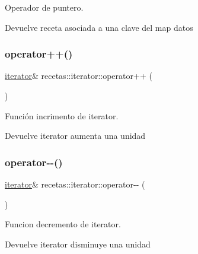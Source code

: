 Operador de puntero. 

\begin{DoxyReturn}{Devuelve}
receta asociada a una clave del map datos 
\end{DoxyReturn}
\mbox{\label{classrecetas_1_1iterator_a46b9341b6477309554abc562b1cbbcb7}} 
\subsubsection{\texorpdfstring{operator++()}{operator++()}}
{\footnotesize\ttfamily \hyperlink{classrecetas_1_1iterator}{iterator}\& recetas\+::iterator\+::operator++ (\begin{DoxyParamCaption}{ }\end{DoxyParamCaption})}



Función incrimento de iterator. 

\begin{DoxyReturn}{Devuelve}
iterator aumenta una unidad 
\end{DoxyReturn}
\mbox{\label{classrecetas_1_1iterator_acd93e50f3790178073f67b399863ca38}} 
\subsubsection{\texorpdfstring{operator-\/-\/()}{operator--()}}
{\footnotesize\ttfamily \hyperlink{classrecetas_1_1iterator}{iterator}\& recetas\+::iterator\+::operator-\/-\/ (\begin{DoxyParamCaption}{ }\end{DoxyParamCaption})}



Funcion decremento de iterator. 

\begin{DoxyReturn}{Devuelve}
iterator disminuye una unidad 
\end{DoxyReturn}
\mbox{\label{classrecetas_1_1iterator_ab8e6b3561483a54ee6469be09c8ddee6}} 
